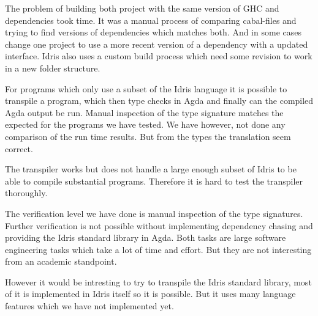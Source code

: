 The problem of building both project with the same version of GHC and
dependencies took time. It was a manual process of comparing cabal-files and
trying to find versions of dependencies which matches both. And in some cases
change one project to use a more recent version of a dependency with a updated
interface. Idris also uses a custom build process which need some revision to
work in a new folder structure.


For programs which only use a subset of the Idris
language it is possible to transpile a program, which then type checks in Agda
and finally can the compiled Agda output be run. Manual inspection of the type
signature matches the expected for the programs we have tested. We have
however, not done any comparison of the run time results. But from the types
the translation seem correct.

The transpiler works but does not handle a large enough subset of Idris to be
able to compile substantial programs. Therefore it is hard to test the
transpiler thoroughly.


The verification level we have done is manual inspection of the type
signatures. Further verification is not possible without implementing
dependency chasing and providing the Idris standard library in Agda. Both tasks
are large software engineering tasks which take a lot of time and effort. But
they are not interesting from an academic standpoint.

However it would be intresting to try to transpile the Idris standard library,
most of it is implemented in Idris itself so it is possible. But it uses many
language features which we have not implemented yet.

